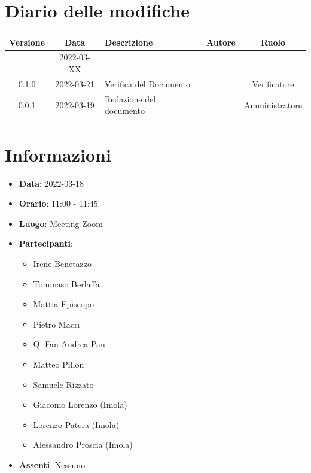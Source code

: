\documentclass[12pt, a4paper,table]{article}
\begin{document}
	\section*{Diario delle modifiche}
	\begin{center}
	\renewcommand{\arraystretch}{1.8} %
	\begin{tabular}{ |c|c|m{12em}|m{7em}|c| }
	\hline
	\textbf{Versione} & \textbf{Data} & \textbf{Descrizione} &  \textbf{Autore} &  \textbf{Ruolo} \\
	\hline
    & 2022-03-XX & & & \\
	\hline
	0.1.0 & 2022-03-21 & Verifica del Documento & \docVerificatori & Verificatore\\
	\hline
	0.0.1 & 2022-03-19 & Redazione del documento & \docRedattori & Amministratore\\
	\hline
	\end{tabular}
	\end{center}
	\newpage

	\tableofcontents
	\newpage

	\section{Informazioni}
	\begin{itemize}
		\item \textbf{Data}: 2022-03-18
		\item \textbf{Orario}: 11:00 - 11:45
		\item \textbf{Luogo}: Meeting Zoom
		\item \textbf{Partecipanti}:
		\begin{itemize}
			\item Irene Benetazzo
			\item Tommaso Berlaffa
			\item Mattia Episcopo
			\item Pietro Macrì
			\item Qi Fan Andrea Pan
			\item Matteo Pillon
			\item Samuele Rizzato
			\item Giacomo Lorenzo (Imola)
            		\item Lorenzo Patera (Imola)
            		\item Alessandro Proscia (Imola)            
		\end{itemize}
        \item \textbf{Assenti}: Nessuno
	\end{itemize}
\end{document}
